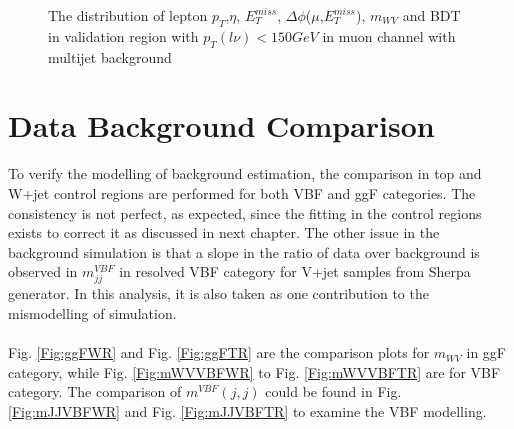 \begin{figure}[ht]
	\caption{The distribution of lepton $p_{T}$,$\eta$, $E_{T}^{miss}$, $\Delta\phi$($\mu$,$E_{T}^{miss}$), $m_{WV}$ and BDT in validation region with $p_{T}(l\nu)<150 GeV$ in muon channel with multijet background}
	\label{fig:FakeVR2_mu}
\end{figure}
\clearpage
\section{Data Background Comparison}
\label{Sec:data_bkg_compar}
To verify the modelling of background estimation, the comparison in top and W+jet control regions are performed for both VBF and ggF categories. The consistency is not perfect, as expected, since the fitting in the control regions exists to correct it as discussed in next chapter. The other issue in the background simulation is that a slope in the ratio of data over background is observed in $m^{VBF}_{jj}$ in resolved VBF category for V+jet samples from Sherpa generator. In this analysis, it is also taken as one contribution to the mismodelling of simulation. 
\\
\\Fig. \ref{Fig:ggFWR} and Fig. \ref{Fig:ggFTR} are the comparison plots for $m_{WV}$ in ggF category, while Fig. \ref{Fig:mWVVBFWR} to Fig. \ref{Fig:mWVVBFTR} are for VBF category. The comparison of  $m^{VBF}(j,j)$ could be found in Fig. \ref{Fig:mJJVBFWR} and Fig. \ref{Fig:mJJVBFTR} to examine the VBF modelling. 
\newpage

